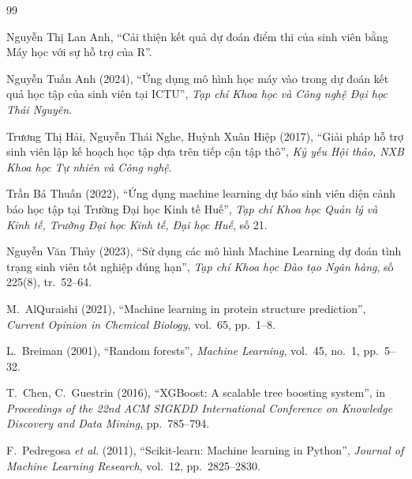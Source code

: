 \documentclass[12pt,a4paper,oneside]{report}
\newcommand{\bmchapname}{Chương}
\renewcommand{\appendixname}{Phụ lục}%
\newcommand{\tocchapname}{Chương}
\begin{document}
\begin{thebibliography}{99}
\setlength{\itemsep}{2pt}

Nguyễn Thị Lan Anh, ``Cải thiện kết quả dự đoán điểm thi của sinh viên
bằng Máy học với sự hỗ trợ của R''.

Nguyễn Tuấn Anh (2024), ``Ứng dụng mô hình học máy vào trong dự đoán kết
quả học tập của sinh viên tại ICTU'', \textit{Tạp chí Khoa học và Công nghệ
Đại học Thái Nguyên}.

Trương Thị Hải, Nguyễn Thái Nghe, Huỳnh Xuân Hiệp (2017), ``Giải pháp hỗ trợ
sinh viên lập kế hoạch học tập dựa trên tiếp cận tập thô'',
\textit{Kỷ yếu Hội thảo, NXB Khoa học Tự nhiên và Công nghệ}.

Trần Bá Thuấn (2022), ``Ứng dụng machine learning dự báo sinh viên diện cảnh
báo học tập tại Trường Đại học Kinh tế Huế'', \textit{Tạp chí Khoa học Quản
lý và Kinh tế, Trường Đại học Kinh tế, Đại học Huế}, số 21.

Nguyễn Văn Thủy (2023), ``Sử dụng các mô hình Machine Learning dự đoán tình
trạng sinh viên tốt nghiệp đúng hạn'', \textit{Tạp chí Khoa học Đào tạo
Ngân hàng}, số 225(8), tr.~52--64.

M.~AlQuraishi (2021), ``Machine learning in protein structure prediction'',
\textit{Current Opinion in Chemical Biology}, vol.~65, pp.~1--8.

L.~Breiman (2001), ``Random forests'', \textit{Machine Learning}, vol.~45,
no.~1, pp.~5--32.

T.~Chen, C.~Guestrin (2016), ``XGBoost: A scalable tree boosting system'',
in \textit{Proceedings of the 22nd ACM SIGKDD International Conference on
Knowledge Discovery and Data Mining}, pp.~785--794.

F.~Pedregosa \textit{et al.} (2011), ``Scikit-learn: Machine learning in
Python'', \textit{Journal of Machine Learning Research}, vol.~12,
pp.~2825--2830.

\end{thebibliography}

\appendix
\renewcommand{\bmchapname}{Phụ lục}
\addtocontents{toc}{\protect\renewcommand{\protect\tocchapname}{\appendixname}}
\end{document}
